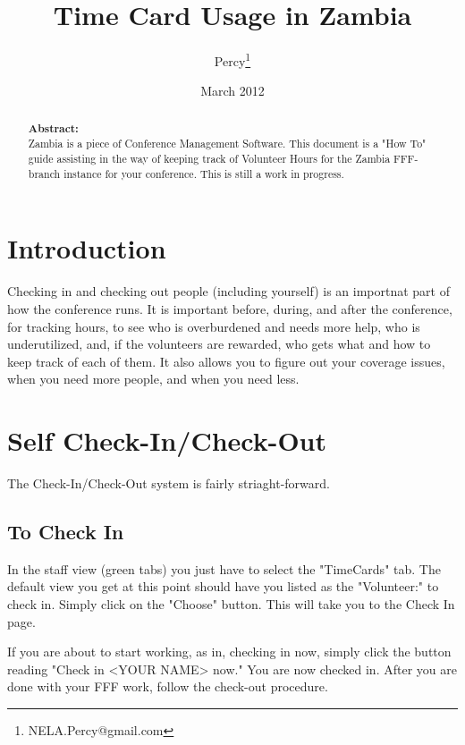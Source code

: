\documentclass[captions=tablesignature]{scrartcl}
\author{Percy\thanks{NELA.Percy@gmail.com}}
\date{March 2012}
\title{Time Card Usage in Zambia}
\begin{document}
\maketitle
{}
\thispagestyle{fancy}
\renewcommand{\headrulewidth}{0pt}
\renewcommand{\footrulewidth}{0pt}
\lhead{}
\rhead{}
\chead{}
\lfoot{}
\cfoot{}
\rfoot{}
\begin{abstract}
\vspace{5cm}
{\LARGE{\textbf{Abstract:\\}}}
Zambia is a piece of Conference Management Software.  This document is a "How To" guide assisting in the way of keeping track of Volunteer Hours for the Zambia FFF-branch instance for your conference.  This is still a work in progress.
\end{abstract}
\newpage
\renewcommand{\headrulewidth}{1pt}
\renewcommand{\footrulewidth}{1pt}
\rfoot{\thepage}
\setcounter{tocdepth}{3}
\tableofcontents
\newpage
{}
\section{Introduction}
\label{sec-1}

Checking in and checking out people (including yourself) is an
importnat part of how the conference runs.  It is important before,
during, and after the conference, for tracking hours, to see who is
overburdened and needs more help, who is underutilized, and, if the
volunteers are rewarded, who gets what and how to keep track of each
of them.  It also allows you to figure out your coverage issues,
when you need more people, and when you need less.
\section{Self Check-In/Check-Out}
\label{sec-2}

The Check-In/Check-Out system is fairly striaght-forward.  
\subsection{To Check In}
\label{sec-2-1}
In the staff view (green tabs) you just have to select the
"TimeCards" tab.  The default view you get at this point should
have you listed as the "Volunteer:" to check in.  Simply click on
the "Choose" button.  This will take you to the Check In page.

If you are about to start working, as in, checking in now, simply
click the button reading "Check in <YOUR NAME> now."  You are now
checked in.  After you are done with your FFF work, follow the
check-out procedure.
\end{document}
